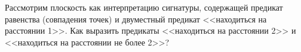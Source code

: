 Рассмотрим плоскость как интерпретацию сигнатуры, содержащей предикат равенства (совпадения точек) и двуместный предикат
<<находиться на расстоянии 1>>. Как выразить предикаты <<находиться на расстоянии 2>> и <<находиться на расстоянии не более
2>>?